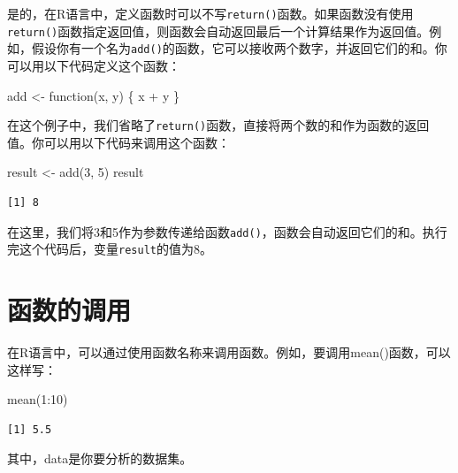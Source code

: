 \documentclass[
  letterpaper,
  DIV=11,
  numbers=noendperiod]{scrreprt}
\newenvironment{Shaded}{\begin{snugshade}}{\end{snugshade}}
\newcommand{\ControlFlowTok}[1]{\textcolor[rgb]{0.00,0.23,0.31}{#1}}
\newcommand{\DecValTok}[1]{\textcolor[rgb]{0.68,0.00,0.00}{#1}}
\newcommand{\FunctionTok}[1]{\textcolor[rgb]{0.28,0.35,0.67}{#1}}
\newcommand{\NormalTok}[1]{\textcolor[rgb]{0.00,0.23,0.31}{#1}}
\newcommand{\OtherTok}[1]{\textcolor[rgb]{0.00,0.23,0.31}{#1}}
\newcommand{\SpecialCharTok}[1]{\textcolor[rgb]{0.37,0.37,0.37}{#1}}
\begin{document}
是的，在R语言中，定义函数时可以不写\texttt{return()}函数。如果函数没有使用\texttt{return()}函数指定返回值，则函数会自动返回最后一个计算结果作为返回值。例如，假设你有一个名为\texttt{add()}的函数，它可以接收两个数字，并返回它们的和。你可以用以下代码定义这个函数：

\begin{Shaded}
\begin{Highlighting}[]
\NormalTok{add }\OtherTok{\textless{}{-}} \ControlFlowTok{function}\NormalTok{(x, y) \{}
\NormalTok{ x }\SpecialCharTok{+}\NormalTok{ y}
\NormalTok{\}}
\end{Highlighting}
\end{Shaded}

在这个例子中，我们省略了\texttt{return()}函数，直接将两个数的和作为函数的返回值。你可以用以下代码来调用这个函数：

\begin{Shaded}
\begin{Highlighting}[]
\NormalTok{result }\OtherTok{\textless{}{-}} \FunctionTok{add}\NormalTok{(}\DecValTok{3}\NormalTok{, }\DecValTok{5}\NormalTok{)}
\NormalTok{result}
\end{Highlighting}
\end{Shaded}

\begin{verbatim}
[1] 8
\end{verbatim}

在这里，我们将3和5作为参数传递给函数\texttt{add()}，函数会自动返回它们的和。执行完这个代码后，变量\texttt{result}的值为8。

\hypertarget{ux51fdux6570ux7684ux8c03ux7528}{%
\section{函数的调用}\label{ux51fdux6570ux7684ux8c03ux7528}}

在R语言中，可以通过使用函数名称来调用函数。例如，要调用mean()函数，可以这样写：

\begin{Shaded}
\begin{Highlighting}[]
\FunctionTok{mean}\NormalTok{(}\DecValTok{1}\SpecialCharTok{:}\DecValTok{10}\NormalTok{)}
\end{Highlighting}
\end{Shaded}

\begin{verbatim}
[1] 5.5
\end{verbatim}

其中，data是你要分析的数据集。
\end{document}
